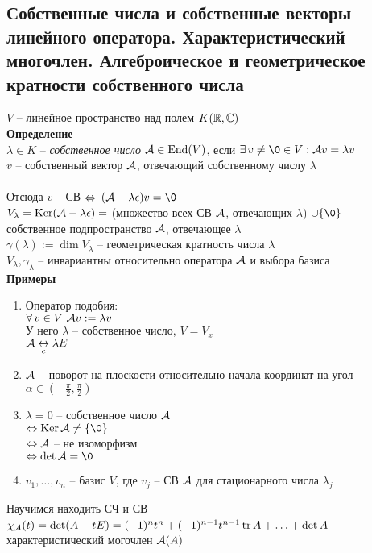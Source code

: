 \documentclass[12pt]{article}
\begin{document}
\subsection{Собственные числа и собственные векторы линейного оператора. Характеристический многочлен. Алгеброическое и геометрическое кратности собственного числа}
$V$ -- линейное пространство над полем $K(\mathbb{R}, \mathbb{C})$\\
\textbf{Определение}\\
$\lambda \in K$ -- \textit{собственное число} $\mathcal{A} \in \operatorname{End}(V)$, если $\ex v \neq \0 \in V: \mcA v = \lambda v$\\
$v$ -- собственный вектор $\mathcal{A}$, отвечающий собственному числу $\lambda$\\\\
Отсюда  $v$ -- СВ $\Leftrightarrow$ $(\mcA - \lambda \epsilon)v = \0$\\
$V_\lambda = \operatorname{Ker} (\mathcal{A} - \lambda\epsilon) = $ (множество всех СВ $\mathcal{A}$, отвечающих $\lambda$) $ \cup \{\0\}$ -- собственное подпространство $\mathcal{A}$, отвечающее $\lambda$\\
$\gamma(\lambda) := \dim V_\lambda$ -- геометрическая кратность числа $\lambda$\\
$V_\lambda, \gamma_\lambda$ -- инвариантны относительно оператора $\mathcal{A}$ и выбора базиса\\
\textbf{Примеры}
\begin{enumerate}
    \item Оператор подобия:\\
    $\forall\, v\in V\ \mathcal{A} v:= \lambda v$\\
    У него $\lambda$ -- собственное число, $V = V_x$\\
    $\mathcal{A} \underset{e}{\leftrightarrow} \lambda E$
    \item $\mathcal{A}$ -- поворот на плоскости относительно начала координат на угол $\alpha \in (-\frac\pi2, \frac\pi2)$
    \item $\lambda = 0$ -- собственное число $\mathcal{A}$\\
    $\LRto \ker \mcA \neq \{\0\}$\\
    $\Leftrightarrow \mathcal{A}$ -- не изоморфизм\\
    $\LRto \det \mcA = \0$
    \item $v_1,\ldots,v_n$ -- базис $V$, где $v_j$ -- СВ $\mathcal{A}$ для стационарного числа $\lambda_j$\\
\end{enumerate}
Научимся находить СЧ и СВ\\
$\chi_\mathcal{A}(t) = \det (A-tE) = (-1)^nt^n+(-1)^{n-1}t^{n-1}\operatorname{tr} A + \ldots + \det A$ -- характеристический могочлен $\mathcal{A}(A)$
\end{document}
